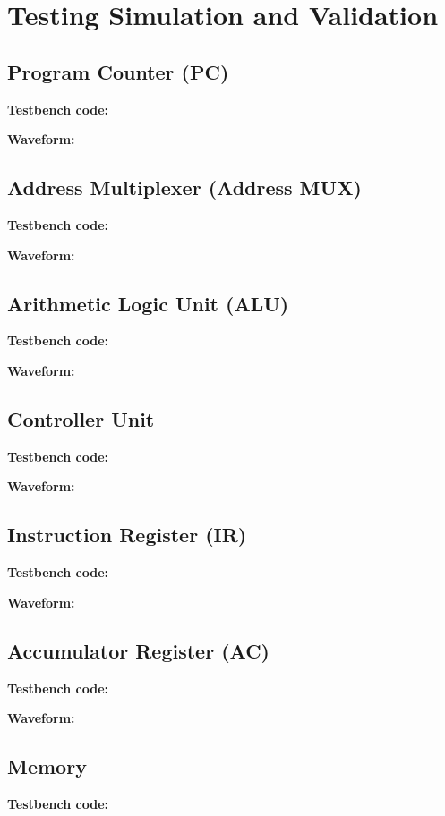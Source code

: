 \section{Testing Simulation and Validation}\label{sec:testing_simulation_and_validation} %
\subsection{Program Counter (PC)}
\textbf{Testbench code:}

\textbf{Waveform:}

\subsection{Address Multiplexer (Address MUX)}
\textbf{Testbench code:}

\textbf{Waveform:}

\subsection{Arithmetic Logic Unit (ALU)}
\textbf{Testbench code:}

\textbf{Waveform:}

\subsection{Controller Unit}
\textbf{Testbench code:}

\textbf{Waveform:}

\subsection{Instruction Register (IR)}
\textbf{Testbench code:}

\textbf{Waveform:}

\subsection{Accumulator Register (AC)}
\textbf{Testbench code:}

\textbf{Waveform:}

\subsection{Memory}
\textbf{Testbench code:}

